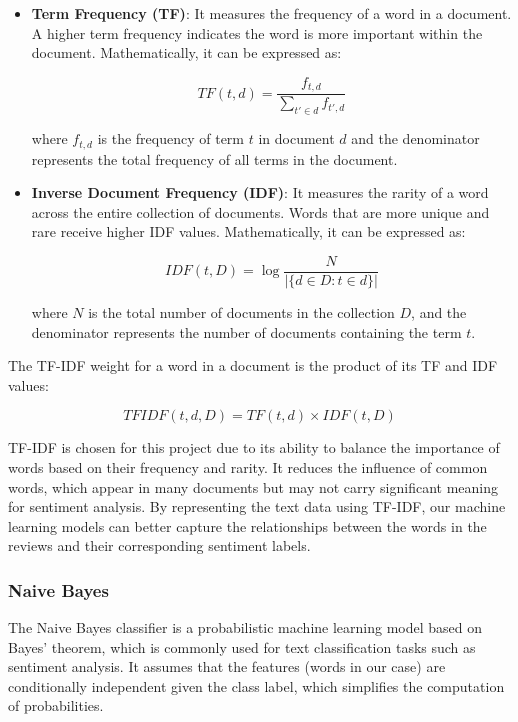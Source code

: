 \documentclass{article}
\begin{document}
\begin{itemize}
\item \textbf{Term Frequency (TF)}: It measures the frequency of a word in a document. A higher term frequency indicates the word is more important within the document. Mathematically, it can be expressed as:


   $$ TF(t, d) = \frac{f_{t, d}}{\sum_{t' \in d} f_{t', d}}$$


where $f_{t, d}$ is the frequency of term $t$ in document $d$ and the denominator represents the total frequency of all terms in the document.

\item \textbf{Inverse Document Frequency (IDF)}: It measures the rarity of a word across the entire collection of documents. Words that are more unique and rare receive higher IDF values. Mathematically, it can be expressed as:

    $$IDF(t, D) = \log \frac{N}{|\{d \in D : t \in d\}|}$$


where $N$ is the total number of documents in the collection $D$, and the denominator represents the number of documents containing the term $t$.

\end{itemize}

The TF-IDF weight for a word in a document is the product of its TF and IDF values:


$$TFIDF(t, d, D) = TF(t, d) \times IDF(t, D)$$


TF-IDF is chosen for this project due to its ability to balance the importance of words based on their frequency and rarity. It reduces the influence of common words, which appear in many documents but may not carry significant meaning for sentiment analysis. By representing the text data using TF-IDF, our machine learning models can better capture the relationships between the words in the reviews and their corresponding sentiment labels.

\subsubsection{Naive Bayes}

The Naive Bayes classifier is a probabilistic machine learning model based on Bayes' theorem, which is commonly used for text classification tasks such as sentiment analysis. It assumes that the features (words in our case) are conditionally independent given the class label, which simplifies the computation of probabilities.
\end{document}
